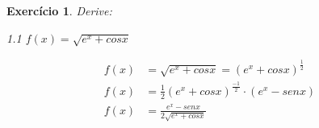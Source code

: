 \documentclass{book}
\numberwithin{defn}{chapter}
\numberwithin{exe}{chapter}
\newtheorem{ex}{Exercício}
\numberwithin{ex}{chapter}
\numberwithin{obs}{chapter}
\numberwithin{fato}{chapter}
\newtheorem{resp}{Resposta}
\numberwithin{resp}{chapter}
\begin{document}
\begin{ex}
Derive:
\item 1.1 $f(x)=\sqrt{e^x+cosx}$ %

\begin{align*}
    f(x)&=\sqrt{e^x+cosx}=(e^x+cosx)^{\frac{1}{2}}\\
    f(x)&=\frac{1}{2}(e^x+cosx)^{\frac{-1}{2}}\cdot (e^x-senx)\\
    f(x)&=\frac{e^x-senx}{2\sqrt{e^x+cosx}}
\end{align*}

\begin{comment}
\begin{resp}
\item 1.2 $f(x)=e^{x+{\frac{1}{x}}}$ %

\begin{align*}
    f(x)&=e^{x+{\frac{1}{x}}}\\
    f'(x)&=e^{x^{10}+\frac{1}{x}}\cdot \left(10^{x^{9}}-\frac{1}{x^2}\right)
\end{align*}

\item 1.3 $f(x)=sen(e^x+9x^2)$ %

\begin{align*}
    f(x)&=sen(e^x+9x^2)\\
    f'(x)&=cos(e^x+9x^2)\cdot (e^x+18x)
\end{align*}

\item 1.4 $f(x)=\frac{3}{x^5+10x}$
\begin{align*}
    f(x)&=\frac{3}{x^5+10x}\\
    f'(x)&=3(x^5+10x)^{-1}\\
    f'(x)&=3(x^5+10x)^{-2}\cdot (5x^4+10)\\
    f'(x)&=\frac{15x^4+30}{(x^5+10x)^2}
\end{align*}


\item 1.5 $f(x)=x^4+\frac{90x^5}{\sqrt{x}}$ %
\begin{align*}
    f(x)&=x^4+\frac{90x^5}{\sqrt{x}}\\
    f'(x)&= x^4+90x^{\frac{9}{2}}\\
    f'(x)&=4x^3+405x^\frac{7}{2}
\end{align*}

\end{resp}
\end{comment}
\end{ex}
\end{document}

